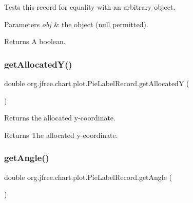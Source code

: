 Tests this record for equality with an arbitrary object.


\begin{DoxyParams}{Parameters}
{\em obj} & the object ({\ttfamily null} permitted).\\
\hline
\end{DoxyParams}
\begin{DoxyReturn}{Returns}
A boolean. 
\end{DoxyReturn}
\mbox{\label{classorg_1_1jfree_1_1chart_1_1plot_1_1_pie_label_record_a0d4d2282bda9a56d3d0bb59947ab520a}} 
\subsubsection{\texorpdfstring{get\+Allocated\+Y()}{getAllocatedY()}}
{\footnotesize\ttfamily double org.\+jfree.\+chart.\+plot.\+Pie\+Label\+Record.\+get\+AllocatedY (\begin{DoxyParamCaption}{ }\end{DoxyParamCaption})}

Returns the allocated y-\/coordinate.

\begin{DoxyReturn}{Returns}
The allocated y-\/coordinate. 
\end{DoxyReturn}
\mbox{\label{classorg_1_1jfree_1_1chart_1_1plot_1_1_pie_label_record_ae08e2461f0ad4404436fc3e7250894ab}} 
\subsubsection{\texorpdfstring{get\+Angle()}{getAngle()}}
{\footnotesize\ttfamily double org.\+jfree.\+chart.\+plot.\+Pie\+Label\+Record.\+get\+Angle (\begin{DoxyParamCaption}{ }\end{DoxyParamCaption})}

